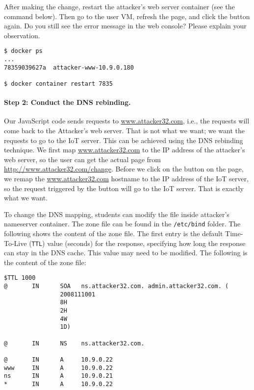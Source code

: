 After making the change, restart the attacker's web server container (see the 
command below). Then go to the user VM, refresh the page, and click the button again. 
Do you still see the error
message in the web console? Please explain your observation. 


\begin{lstlisting}
$ docker ps
...
78359039627a  attacker-www-10.9.0.180

$ docker container restart 7835
\end{lstlisting}
 


\paragraph{Step 2: Conduct the DNS rebinding.}
Our JavaScript code sends requests to \url{www.attacker32.com}, 
i.e., the requests will come back to the Attacker's web server. That is not 
what we want; we want the requests to go to the IoT server. 
This can be achieved using the DNS rebinding 
technique. We first map \url{www.attacker32.com} to the IP address of the attacker's
web server, so
the user can get the actual page from \url{http://www.attacker32.com/change}. 
Before we click on the button on the page, we remap
the \url{www.attacker32.com} hostname to the IP address of the IoT server, so
the request triggered by the button will go to the IoT server. That is exactly what 
we want. 


To change the DNS mapping, students can modify the 
 file inside attacker's nameserver container.
The zone file can be found in 
the \texttt{/etc/bind} folder. 
The following shows the content of the zone file. The first 
entry is the default Time-To-Live (\texttt{TTL}) value (seconds) 
for the response, specifying how long the response can stay in
the DNS cache. This value may need to be modified. 
The following is the content of the zone file:

\begin{lstlisting}
$TTL 1000
@       IN      SOA   ns.attacker32.com. admin.attacker32.com. (
                2008111001
                8H
                2H
                4W
                1D)

@       IN      NS    ns.attacker32.com.

@       IN      A     10.9.0.22
www     IN      A     10.9.0.22
ns      IN      A     10.9.0.21
*       IN      A     10.9.0.22
\end{lstlisting}


